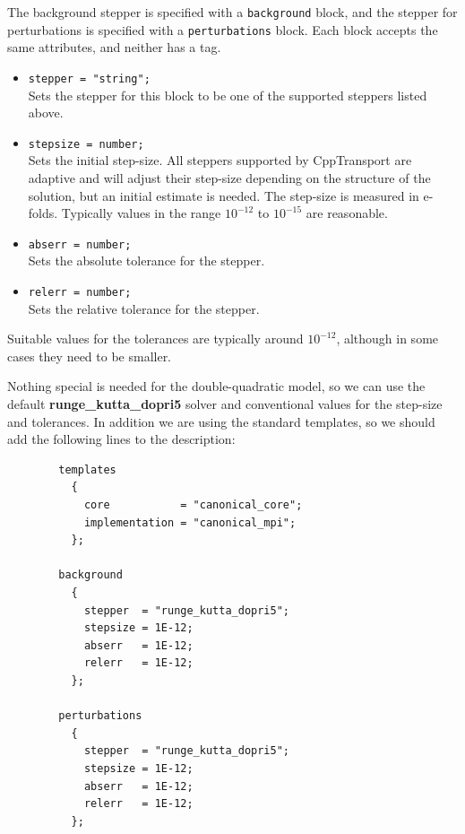 \documentclass[11pt,a4paper]{article}
\newenvironment{example}{\begin{tcolorbox}[enhanced,breakable,colback=black!10,colbacktitle=black!20,colframe=black!40,coltitle=black,title=Example,fonttitle=\sffamily\fontseries{b}\selectfont]}{\end{tcolorbox}}
\newcommand{\packagefont}{\sffamily}
\newcommand{\CppTransport}{{\packagefont CppTransport}}
\newcommand{\block}[1]{\texttt{#1}}
\newcommand{\attribute}[1]{\texttt{#1}}
\newcommand{\option}[1]{{\ttfamily\bfseries\small #1}}
\begin{document}
The background stepper is specified with a \block{background}
block, and the stepper for perturbations is specified with
a \block{perturbations} block.
Each block accepts the same attributes, and neither has a tag.
\begin{itemize}
    \item \attribute{stepper = "string";} \\
    Sets the stepper for this block to be one of the supported
    steppers listed above.
    
    \item \attribute{stepsize = number;} \\
    Sets the initial step-size.
    All steppers supported by {\CppTransport} are adaptive
    and will adjust their step-size depending on the structure
    of the solution, but an initial estimate is needed.
    The step-size is measured in e-folds.
    Typically values in the range $10^{-12}$ to $10^{-15}$
    are reasonable.
    
    \item \attribute{abserr = number;} \\
    Sets the absolute tolerance for the stepper.
    
    \item \attribute{relerr = number;} \\
    Sets the relative tolerance for the stepper.    
\end{itemize}
Suitable values for the tolerances are typically around
$10^{-12}$, although in some cases they need to be smaller.

\begin{example}
    Nothing special is needed for the double-quadratic model,
    so we can use the default
    \option{runge\_kutta\_dopri5}
    solver and conventional values for the step-size and tolerances.
    In addition we are using the standard templates,
    so we should add the following lines to the description:
    \begin{verbatim}
        templates
          {
            core           = "canonical_core";
            implementation = "canonical_mpi"; 
          };
        
        background
          {
            stepper  = "runge_kutta_dopri5";
            stepsize = 1E-12;
            abserr   = 1E-12;
            relerr   = 1E-12;
          };
        
        perturbations
          {
            stepper  = "runge_kutta_dopri5";
            stepsize = 1E-12;
            abserr   = 1E-12;
            relerr   = 1E-12;
          };
    \end{verbatim}

\end{example}
\end{document}
